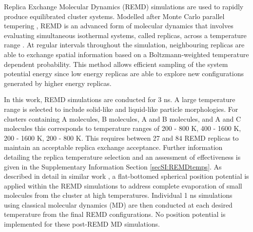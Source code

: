 Replica Exchange Molecular Dynamics (REMD) simulations are used to rapidly produce equilibrated cluster systems. Modelled after Monte Carlo parallel tempering \cite{Hukushima1996}, REMD is an advanced form of molecular dynamics that involves evaluating simultaneous isothermal systems, called replicas, across a temperature range \cite{Sugita1999}. At regular intervals throughout the simulation, neighbouring replicas are able to exchange spatial information based on a Boltzmann-weighted temperature dependent probability. This method allows efficient sampling of the system potential energy since low energy replicas are able to explore new configurations generated by higher energy replicas. 

In this work, REMD simulations are conducted for 3 ns. A large temperature range is selected to include solid-like and liquid-like particle morphologies. For clusters containing A molecules, B molecules, A and B molecules, and A and C molecules this corresponds to temperature ranges of 200 - 800 K, 400 - 1600 K, 200 - 1600 K, 200 - 800 K. This requires between 27 and 84 REMD replicas to maintain an acceptable replica exchange acceptance. Further information detailing the replica temperature selection and an assessment of effectiveness is given in the Supplementary Information Section \ref{secSI:REMDtemps}. As described in detail in similar work \cite{bowal2018partitioning}, a flat-bottomed spherical position potential is applied within the REMD simulations to address complete evaporation of small molecules from the cluster at high temperatures. Individual 1 ns simulations using classical molecular dynamics (MD) are then conducted at each desired temperature from the final REMD configurations. No position potential is implemented for these post-REMD MD simulations.

